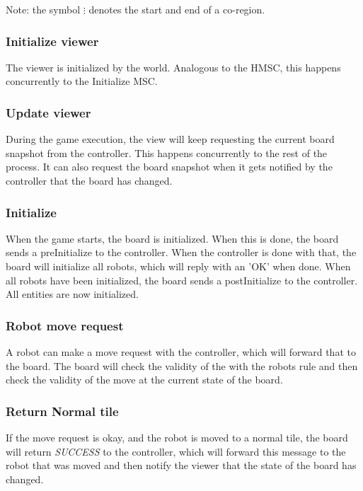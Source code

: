 	Note: the symbol $\vdots$ denotes the start and end of a co-region.

	\subsubsection{Initialize viewer}
	The viewer is initialized by the world. Analogous to the HMSC, this happens concurrently to the Initialize MSC.
	
	

    	\subsubsection{Update viewer}
	During the game execution, the view will keep requesting the current board snapshot from the controller. This happens concurrently to the rest of the process. It can also request the board snapshot when it gets notified by the controller that the board has changed.
    	
	

	\subsubsection{Initialize}
	When the game starts, the board is initialized. When this is done, the board sends a preInitialize to the controller. When the controller is done with that, the board will initialize all robots, which will reply with an 'OK' when done. When all robots have been initialized, the board sends a postInitialize to the controller. All entities are now initialized.
  	
	
    	
	\subsubsection{Robot move request}
	A robot can make a move request with the controller, which will forward that to the board. The board will check the validity of the with the robots rule and then check the validity of the move at the current state of the board.

	

	\subsubsection{Return Normal tile}
	If the move request is okay, and the robot is moved to a normal tile, the board will return \emph{SUCCESS} to the controller, which will forward this message to the robot that was moved and then notify the viewer that the state of the board has changed.

